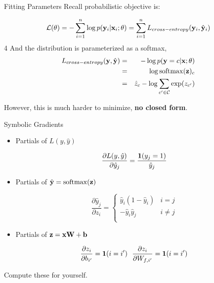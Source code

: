 \documentclass{beamer}
\begin{document}
\begin{frame}{Fitting Parameters}
  Recall probabilistic objective is:

  \[ \mathcal{L}(\theta) = - \sum_{i=1}^n \log p(\mathbf{y}_i | \mathbf{x}_i; \theta) = \sum_{i=1}^n L_{cross-entropy}(\mathbf{y}_i, \hat{\mathbf{y}}_i) \] 
4
  And the distribution is parameterized as a softmax,
  \begin{eqnarray*}
    L_{cross-entropy}(\boldy, \hat{\boldy}) &=& -\log p(\boldy=c | \boldx; \theta) \\
    &=& \log \softmax(\boldz)_c \\
    &=&\hat{z}_c - \log \sum_{c' \in \mcC} \exp(z_{c'}) 
  \end{eqnarray*}

  However, this is much harder to minimize, \textbf{no closed form}.
  
\end{frame}


\begin{frame}{Symbolic Gradients}
  
  \begin{itemize}
  \item 

  Partials of $L(y, \hat{y})$

  \[ \frac{\partial L(y, \hat{y})}{\partial \hat{y}_j} = \frac{\mathbf{1}(y_j = 1)} {\hat{y}_j}  \]
  \pause 

  \item
    Partials of $\hat{\boldy} = \softmax(\boldz)$ 

  \[ \frac{\partial \hat{y}_j }{\partial z_i} =
    \begin{cases}
      \hat{y}_i (1 - \hat{y}_i) & i = j\\
      - \hat{y}_i \hat{y}_j & i \neq j \\
    \end{cases} \]

  \pause 
  \item Partials of $\mathbf{z}  = \mathbf{x} \mathbf{W} + \mathbf{b} $ 

  \[ \frac{\partial z_i }{\partial b_{i'}} = \mathbf{1}(i = i') \ \  \frac{\partial z_i }{\partial W_{f, i'}} = \mathbf{1}(i = i') \]

  \end{itemize}

   Compute these for yourself.
\end{frame}
\end{document}
